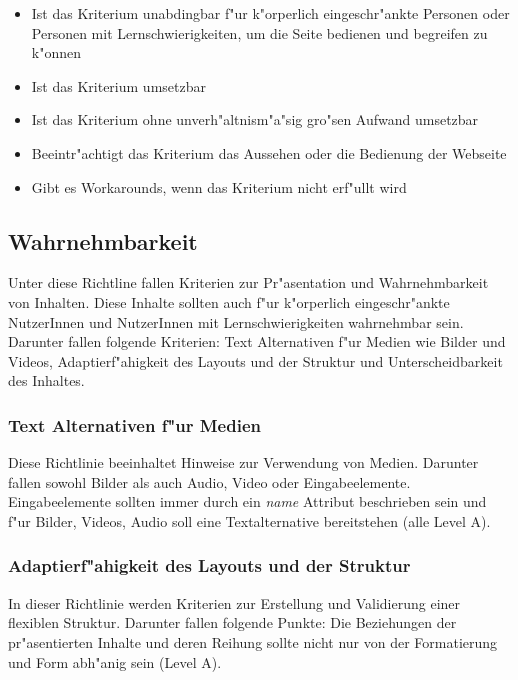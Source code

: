 \documentclass[a4paper,bibtotoc,oneside]{scrbook}
\begin{document}
\begin{itemize}
\item Ist das Kriterium unabdingbar f"ur k"orperlich eingeschr"ankte Personen oder Personen mit Lernschwierigkeiten, um die Seite bedienen und begreifen zu k"onnen
\item Ist das Kriterium umsetzbar
\item Ist das Kriterium ohne unverh"altnism"a"sig gro"sen Aufwand umsetzbar
\item Beeintr"achtigt das Kriterium das Aussehen oder die Bedienung der Webseite
\item Gibt es Workarounds, wenn das Kriterium nicht erf"ullt wird
\end{itemize}


\subsection{Wahrnehmbarkeit}
Unter diese Richtline fallen Kriterien zur Pr"asentation und Wahrnehmbarkeit von Inhalten. Diese Inhalte sollten auch f"ur k"orperlich eingeschr"ankte NutzerInnen und NutzerInnen mit Lernschwierigkeiten wahrnehmbar sein. Darunter fallen folgende Kriterien: Text Alternativen f"ur Medien wie Bilder und Videos, Adaptierf"ahigkeit des Layouts und der Struktur und Unterscheidbarkeit des Inhaltes. \cite[Abschnitt 1]{wcag2} 

\subsubsection{Text Alternativen f"ur Medien}
Diese Richtlinie beeinhaltet Hinweise zur Verwendung von Medien. Darunter fallen sowohl Bilder als auch Audio, Video oder Eingabeelemente. Eingabeelemente sollten immer durch ein \emph{name} Attribut beschrieben sein und f"ur Bilder, Videos, Audio soll eine Textalternative bereitstehen (alle Level A). \cite[Abschnitt 1.1 und 1.2]{wcag2}

\subsubsection{Adaptierf"ahigkeit des Layouts und der Struktur}
In dieser Richtlinie werden Kriterien zur Erstellung und Validierung einer flexiblen Struktur. Darunter fallen folgende Punkte: Die Beziehungen der pr"asentierten Inhalte und deren Reihung sollte nicht nur von der Formatierung und Form abh"anig sein (Level A).\cite[Abschnitt 1.3]{wcag2}
\end{document}
